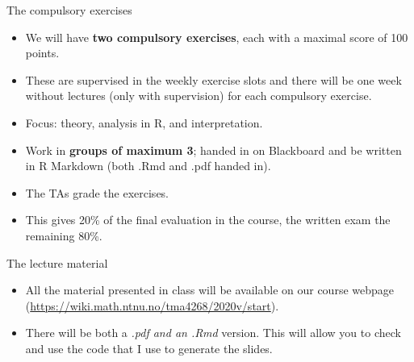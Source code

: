 \documentclass[10pt,ignorenonframetext,]{beamer}
\begin{document}
\begin{frame}

\begin{block}{The compulsory exercises}

\begin{itemize}
\item
  We will have \textbf{two compulsory exercises}, each with a maximal
  score of 100 points.
\item
  These are supervised in the weekly exercise slots and there will be
  one week without lectures (only with supervision) for each compulsory
  exercise.
\item
  Focus: theory, analysis in R, and interpretation.
\item
  Work in \textbf{groups of maximum 3}; handed in on Blackboard and be
  written in R Markdown (both .Rmd and .pdf handed in).
\item
  The TAs grade the exercises.
\item
  This gives 20\% of the final evaluation in the course, the written
  exam the remaining 80\%.
\end{itemize}

\end{block}

\end{frame}

\begin{frame}

\begin{block}{The lecture material}

\vspace{2mm}

\begin{itemize}
\item
  All the material presented in class will be available on our course
  webpage (\url{https://wiki.math.ntnu.no/tma4268/2020v/start}).
\item
  There will be both a \emph{.pdf and an .Rmd} version. This will allow
  you to check and use the code that I use to generate the slides.
\end{itemize}

\end{block}

\end{frame}
\end{document}
